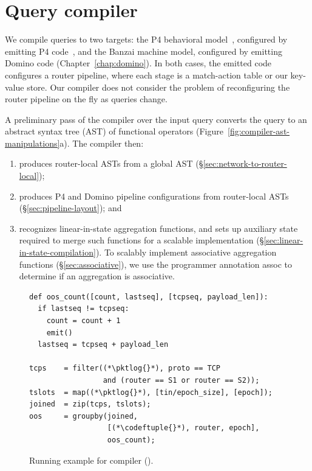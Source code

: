 \section{Query compiler}
\label{sec:compiler}

We compile \TheSystem queries to two targets: the P4 behavioral
model~\cite{p4-bmv2}, configured by emitting P4 code~\cite{p4_16}, and the
Banzai machine model, configured by emitting Domino code
(Chapter~\ref{chap:domino}).  In both cases, the emitted code configures a
router pipeline, where each stage is a match-action table or our key-value
store. Our compiler does not consider the problem of reconfiguring the
router pipeline on the fly as queries change.

A preliminary pass of the compiler over the input query converts the query to
an abstract syntax tree (AST) of functional operators
(Figure~\ref{fig:compiler-ast-manipulations}a). The compiler then:
\begin{enumerate}
\item produces router-local ASTs from a global AST
  (\S\ref{sec:network-to-router-local});
\item produces P4 and Domino pipeline configurations from router-local ASTs
  (\S\ref{sec:pipeline-layout}); and
\item recognizes linear-in-state aggregation functions, and sets up
  auxiliary state required to merge such functions for a scalable implementation
  (\S\ref{sec:linear-in-state-compilation}). To scalably implement associative
  aggregation functions (\S\ref{sec:associative}), we use the programmer
  annotation {\ct assoc} to determine if an aggregation is associative.
\end{enumerate}

\begin{figure}[!t]{
\figcodesize
\begin{lstlisting}
def oos_count([count, lastseq], [tcpseq, payload_len]):
  if lastseq != tcpseq:
    count = count + 1
    emit()
  lastseq = tcpseq + payload_len

tcps    = filter((*\pktlog{}*), proto == TCP
                 and (router == S1 or router == S2));
tslots  = map((*\pktlog{}*), [tin/epoch_size], [epoch]);
joined  = zip(tcps, tslots);
oos     = groupby(joined,
                  [(*\codeftuple{}*), router, epoch],
                  oos_count);
\end{lstlisting}
}
\caption{Running example for \TheSystem compiler ().}
\label{fig:running-example-code}
\end{figure}

